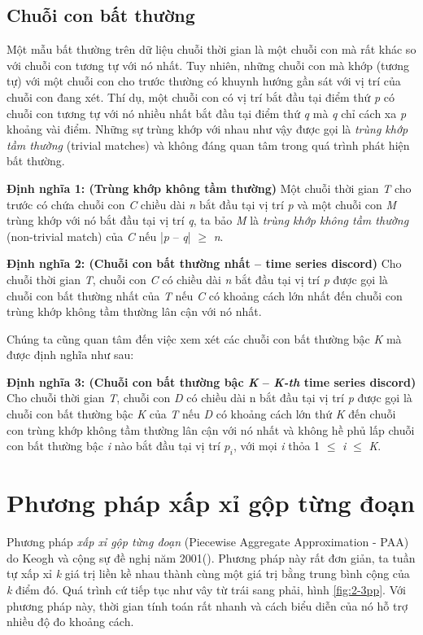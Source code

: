 \subsection{Chuỗi con bất thường}
Một mẫu bất thường trên dữ liệu chuỗi thời gian là một chuỗi con mà rất khác so với chuỗi con tương tự với nó nhất. Tuy nhiên, những chuỗi con mà khớp (tương tự) với một chuỗi con cho trước thường có khuynh hướng gần sát với vị trí của chuỗi con đang xét. Thí dụ, một chuỗi con có vị trí bắt đầu tại điểm thứ \textit{p} có chuỗi con tương tự với nó nhiều nhất bắt đầu tại điểm thứ \textit{q} mà \textit{q} chỉ cách xa \textit{p} khoảng vài điểm. Những sự trùng khớp với nhau như vậy được gọi là \textit{trùng khớp tầm thường} (trivial matches) và không đáng quan tâm trong quá trình phát hiện bất thường.

\textbf{Định nghĩa 1: (Trùng khớp không tầm thường)} Một chuỗi thời gian \textit{T} cho trước có chứa chuỗi con \textit{C} chiều dài \textit{n} bắt đầu tại vị trí \textit{p} và một chuỗi con \textit{M} trùng khớp với nó bắt đầu tại vị trí \textit{q}, ta bảo \textit{M} là \textit{trùng khớp không tầm thường} (non-trivial match) của \textit{C} nếu |\textit{p} – \textit{q}| $\geq$ \textit{n}.

\textbf{Định nghĩa 2: (Chuỗi con bất thường nhất – time series discord)} Cho chuỗi thời gian \textit{T}, chuỗi con \textit{C} có chiều dài \textit{n} bắt đầu tại vị trí \textit{p} được gọi là chuỗi con bất thường nhất của \textit{T} nếu \textit{C} có khoảng cách lớn nhất đến chuỗi con trùng khớp không tầm thường lân cận với nó nhất. 

Chúng ta cũng quan tâm đến việc xem xét các chuỗi con bất thường bậc \textit{K} mà được định nghĩa như sau:

\textbf{Định nghĩa 3: (Chuỗi con bất thường bậc \textit{K} – \textit{K-th} time series discord)}  Cho chuỗi thời gian \textit{T}, chuỗi con \textit{D} có chiều dài n bắt đầu tại vị trí \textit{p} được gọi là chuỗi con bất thường bậc \textit{K} của \textit{T} nếu \textit{D} có khoảng cách lớn thứ \textit{K} đến chuỗi con trùng khớp không tầm thường lân cận với nó nhất và không hề phủ lấp chuỗi con bất thường bậc \textit{i} nào bắt đầu tại vị trí $p_{i}$, với mọi \textit{i} thỏa 1 $\leq$ \textit{i} $\leq$ \textit{K}.

\section{Phương pháp xấp xỉ gộp từng đoạn}
Phương pháp \textit{xấp xỉ gộp từng đoạn} (Piecewise Aggregate Approximation - PAA) do Keogh và cộng sự đề nghị năm 2001(\cite{st35}). Phương pháp này rất đơn giản, ta tuần tự xấp xỉ \textit{k} giá trị liền kề nhau thành cùng một giá trị bằng trung bình cộng của \textit{k} điểm đó. Quá trình cứ tiếp tục như vây từ trái sang phải, hình \ref{fig:2-3pp}. Với phương pháp này, thời gian tính toán rất nhanh và cách biểu diễn của nó hỗ trợ nhiều độ đo khoảng cách.

